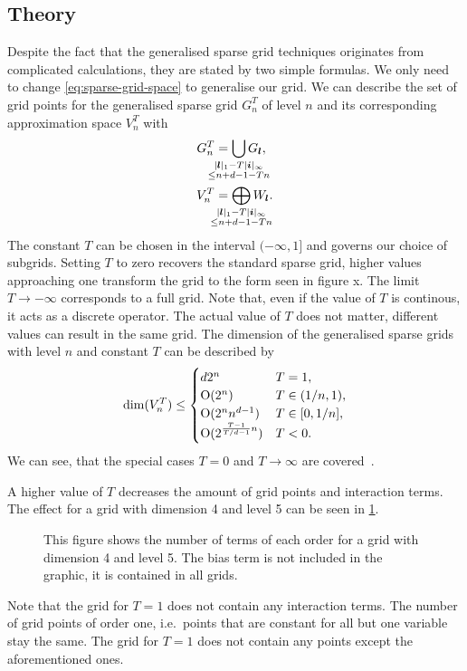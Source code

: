 \subsection{Theory}
Despite the fact that the generalised sparse grid techniques originates from
complicated calculations, they are stated by two simple formulas.
We only need to change \vref{eq:sparse-grid-space} to generalise our grid.
We can describe the set of grid points for the generalised sparse grid \(G^T_n\)
of level \(n\) and its corresponding approximation space \(V^T_n\) with
\begin{align*}
G_n^T &= \bigcup_{\mathclap{\substack{\vert {\bm{l}} \vert_1 - T \vert \bm{i} \vert_\infty \\ \leq n + d - 1 - T n}}} G_{\bm{l}},\\
V_n^T &= \bigoplus_{\mathclap{\substack{\vert {\bm{l}} \vert_1 - T \vert \bm{i} \vert_\infty \\ \leq n + d - 1 - T n}}} W_{\bm{l}}.
\end{align*}
The constant \(T\) can be chosen in the interval \((-\infty, 1]\) and governs
our choice of subgrids.
Setting \(T\) to zero recovers the standard sparse grid, higher values
approaching one transform the grid to the form seen in figure x.
The limit \(T \to -\infty\) corresponds to a full grid.
Note that, even if the value of \(T\) is continous, it acts as a discrete
operator.
The actual value of \(T\) does not matter, different values can result in the
same grid.
The dimension of the generalised sparse grids with level \(n\) and constant
\(T\) can be described by
\begin{equation*}
  \operatorname{dim}(V^T_n) \leq
  \begin{cases}
    d 2^n & T = 1, \\
    \operatorname{O}(2^n) & T \in (1/n, 1),\\
    \operatorname{O}(2^n n^{d-1}) & T \in [0, 1/n],\\
    \operatorname{O}(2^{\frac{T - 1}{T/d - 1} n}) & T < 0.
  \end{cases}
\end{equation*}
We can see, that the special cases \(T = 0\) and \(T \to \infty\) are covered~\cite{optimizedApproxSpaces}.

A higher value of \(T\) decreases the amount of grid points and interaction terms.
The effect for a grid with dimension 4 and level 5 can be seen in \cref{fig:adaptivity}.
\begin{figure}[thb]
%
\caption[Order of interaction terms for generalised sparse grids.]{
This figure shows the number of terms of each order for a grid with dimension 4
and level 5.
The bias term is not included in the graphic, it is contained in all grids.}\label{fig:adaptivity}
\end{figure}
Note that the grid for \(T = 1\) does not contain any interaction terms.
The number of grid points of order one, i.e.~points that are constant for all
but one variable stay the same.
The grid for \(T = 1\) does not contain any points except the aforementioned
ones.
